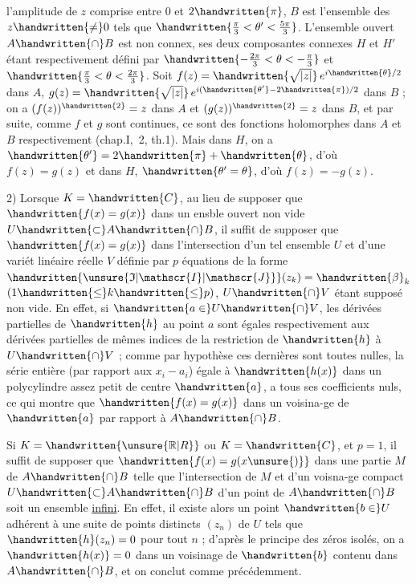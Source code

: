 l'amplitude de $z$ comprise entre $0$ et $2\handwritten{\pi}$, $B$ est l'ensemble des $z\handwritten{\neq}0$ tels que $\handwritten{\frac{\pi}{3}<\theta'<\frac{5\pi}{3}}$. L'ensemble ouvert $A\handwritten{\cap}B$ est non connex, ses deux composantes connexes $H$ et $H'$ étant respectivement défini par $\handwritten{-\frac{2\pi}{3}<\theta<-\frac{\pi}{3}}$ et $\handwritten{\frac{\pi}{3}<\theta<\frac{2\pi}{3}}$. Soit $f(z)=\handwritten{\sqrt{|z|}}\,e^{i\handwritten{\theta}/2}$ dans $A$, $g(z)=\handwritten{\sqrt{|z|}}\,e^{i(\handwritten{\theta'}-2\handwritten{\pi})/2}$ dans $B$ ; on a $(f(z))^{\handwritten{2}}=z$ dans $A$ et $(g(z))^{\handwritten{2}}=z$ dans $B$, et par suite, comme $f$ et $g$ sont continues, ce sont des fonctions holomorphes dans $A$ et $B$ respectivement (chap.I, \handwritten{\S}\,2, th.1). Mais dans $H$, on a $\handwritten{\theta'}=2\handwritten{\pi}+\handwritten{\theta}$, d'où $f(z)=g(z)$ et dans $H$, $\handwritten{\theta'=\theta}$, d'où $f(z)=-g(z)$.

2) Lorsque $K=\handwritten{C}$, au lieu de supposer que $\handwritten{f(x)=g(x)}$ dans un ensble ouvert non vide $U\handwritten{\subset}A\handwritten{\cap}B$, il suffit de supposer que $\handwritten{f(x)=g(x)}$ dans l'intersection d'un tel ensemble $U$ et d'une variét linéaire réelle $V$ définie par $p$ équations de la forme $\handwritten{\unsure{\mathfrak{I}|\mathscr{I}|\mathscr{J}}}(z_k)=\handwritten{\beta}_k$ $(1\handwritten{\leq}k\handwritten{\leq}p)$, $U\handwritten{\cap}V$ étant supposé non vide. En effet, si $\handwritten{a\in}U\handwritten{\cap}V$, les dérivées partielles de $\handwritten{h}$ au point $a$ sont égales respectivement aux dérivées partielles de mêmes indices de la restriction de $\handwritten{h}$ à $U\handwritten{\cap}V$ ; comme par hypothèse ces dernières sont toutes nulles, la série entière (par rapport aux $x_i-a_i$) égale à $\handwritten{h(x)}$ dans un polycylindre assez petit de centre $\handwritten{a}$, a tous ses coefficients nuls, ce qui montre que $\handwritten{f(x)=g(x)}$ dans un voisina-ge de $\handwritten{a}$ par rapport à $A\handwritten{\cap}B$.

Si $K=\handwritten{\unsure{\mathbb{R}|R}}$ ou $K=\handwritten{C}$, et $p=1$, il suffit de supposer que $\handwritten{f(x)=g(x\unsure{)}}$ dans une partie $M$ de $A\handwritten{\cap}B$ telle que l'intersection de $M$ et d'un voisna-ge compact $U\handwritten{\subset}A\handwritten{\cap}B$ d'un point de $A\handwritten{\cap}B$ soit un ensemble \uline{infini}. En effet, il existe alors un point $\handwritten{b\in}U$ adhérent à une suite de points distincts $(z_n)$ de $U$ tels que $\handwritten{h}(z_n)=0$ pour tout $n$ ; d'après le principe des zéros isolés, on a $\handwritten{h(x)}=0$ dans un voisinage de $\handwritten{b}$ contenu dans $A\handwritten{\cap}B$, et on conclut comme précédemment.

